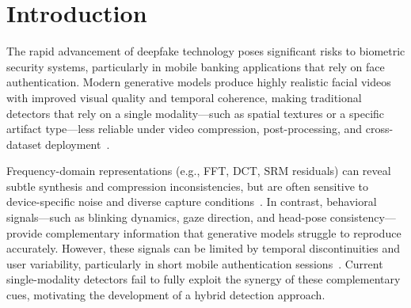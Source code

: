 \documentclass[conference]{IEEEtran}
\begin{document}


\section{Introduction}

The rapid advancement of deepfake technology poses significant risks to biometric security systems, particularly in mobile banking applications that rely on face authentication. Modern generative models produce highly realistic facial videos with improved visual quality and temporal coherence, making traditional detectors that rely on a single modality—such as spatial textures or a specific artifact type—less reliable under video compression, post-processing, and cross-dataset deployment~\cite{b1,b2,b5}.

Frequency-domain representations (e.g., FFT, DCT, SRM residuals) can reveal subtle synthesis and compression inconsistencies, but are often sensitive to device-specific noise and diverse capture conditions~\cite{b5,b9}. In contrast, behavioral signals—such as blinking dynamics, gaze direction, and head-pose consistency—provide complementary information that generative models struggle to reproduce accurately. However, these signals can be limited by temporal discontinuities and user variability, particularly in short mobile authentication sessions~\cite{b6,b10,b11}. Current single-modality detectors fail to fully exploit the synergy of these complementary cues, motivating the development of a hybrid detection approach.
\end{document}
